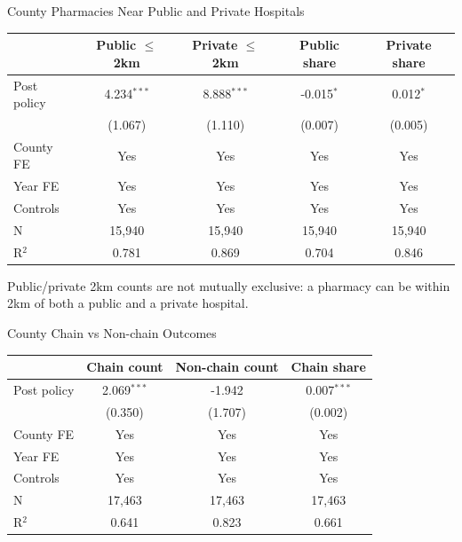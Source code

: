 \documentclass{beamer}
\begin{document}
\begin{frame}{County Pharmacies Near Public and Private Hospitals}

\centering
\scriptsize
\setlength{\tabcolsep}{5pt}

\begin{tabular}{lcccc}
\toprule
& Public $\leq$2km & Private $\leq$2km & Public share & Private share \\
\midrule
Post policy
& 4.234$^{***}$ & 8.888$^{***}$ & -0.015$^{*}$ & 0.012$^{*}$ \\
& (1.067) & (1.110) & (0.007) & (0.005) \\
\midrule
County FE & Yes & Yes & Yes & Yes \\
Year FE & Yes & Yes & Yes & Yes \\
Controls & Yes & Yes & Yes & Yes \\
\midrule
N & 15,940 & 15,940 & 15,940 & 15,940 \\
R$^2$ & 0.781 & 0.869 & 0.704 & 0.846 \\
\bottomrule
\end{tabular}

\vspace{0.6em}
\raggedright
\tiny Public/private 2km counts are not mutually exclusive: a pharmacy can be within 2km of both a public and a private hospital.

\end{frame}

\begin{frame}{County Chain vs Non-chain Outcomes}

\centering
\scriptsize
\setlength{\tabcolsep}{7pt}

\begin{tabular}{lccc}
\toprule
& Chain count & Non-chain count & Chain share \\
\midrule
Post policy
& 2.069$^{***}$ & -1.942 & 0.007$^{***}$ \\
& (0.350) & (1.707) & (0.002) \\
\midrule
County FE & Yes & Yes & Yes \\
Year FE & Yes & Yes & Yes \\
Controls & Yes & Yes & Yes \\
\midrule
N & 17,463 & 17,463 & 17,463 \\
R$^2$ & 0.641 & 0.823 & 0.661 \\
\bottomrule
\end{tabular}

\end{frame}
\end{document}
